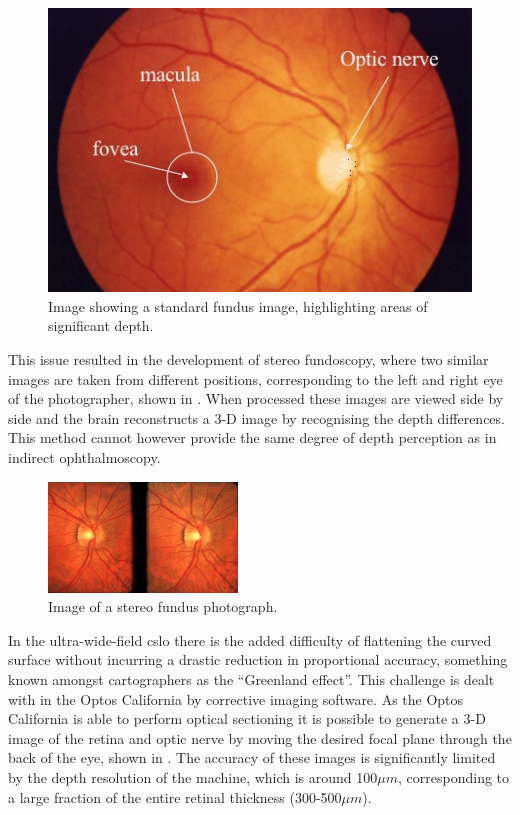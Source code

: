 \begin{figure}[H]
\centering
\includegraphics{figures/normalfundus}
\caption{Image showing a standard fundus image, highlighting areas of significant depth.\cite{saine2002ophthalmic}}
\label{fig:standard}
   \end{figure}

This issue resulted in the development of stereo fundoscopy, where
two similar images are taken from different positions, corresponding
to the left and right eye of the photographer, shown in .
When processed these images are viewed side by side and the brain
reconstructs a 3-D image by recognising the depth differences.\cite{tyler1997stereo} This method cannot however provide
the same degree of depth perception as in indirect ophthalmoscopy.

\begin{figure}[H]
\centering
\includegraphics{figures/stereo}
\caption{Image of a stereo fundus photograph.\cite{tyler1997stereo}}
\label{fig:stereo}
   \end{figure}


In the ultra-wide-field \gls{cslo} there is the added difficulty of flattening
the curved surface without incurring a drastic reduction in proportional
accuracy, something known amongst cartographers as the \enquote{Greenland effect}.
This challenge is dealt with in the Optos California by corrective
imaging software. As the Optos California is able to perform optical
sectioning it is possible to generate a 3-D image of the retina and optic
nerve by moving the desired focal plane through the back of the eye, shown
in . The accuracy of these images is significantly limited by the
depth resolution of the machine, which is around 100$\mu m$, corresponding
to  a large fraction of the entire retinal thickness (300-500$\mu m$).

